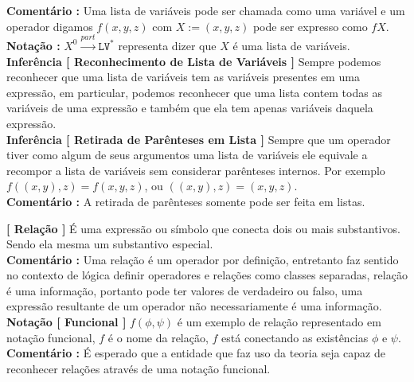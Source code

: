 \documentclass[10pt,a4paper]{report}
\begin{document}
\textbf{Comentário :} Uma lista de variáveis pode ser chamada como uma variável e um operador digamos $f(x,y,z)$ com $X:=(x,y,z) $ pode ser expresso como $fX$.\\

\textbf{Notação :} $ X^0 \overset{part}{\rightarrow} \texttt{LV}^* $ representa dizer que $X$ é uma lista de variáveis.\\

\textbf{Inferência [ Reconhecimento de Lista de Variáveis ]} Sempre podemos reconhecer que uma lista de variáveis tem as variáveis presentes em uma expressão, em particular, podemos reconhecer que uma lista contem todas as variáveis de uma expressão e também que ela tem apenas variáveis daquela expressão.\\

\textbf{Inferência [ Retirada de Parênteses em Lista ]} Sempre que um operador tiver como algum de seus argumentos uma lista de variáveis ele equivale a recompor a lista de variáveis sem considerar parênteses internos. Por exemplo $ f((x,y),z) = f(x,y,z) $, ou $ ((x,y),z) = (x,y,z) $.\\

\textbf{Comentário :} A retirada de parênteses somente pode ser feita em listas.

\hspace{\baselineskip}

\textbf{[ Relação ]} É uma expressão ou símbolo que conecta dois ou mais substantivos. Sendo ela mesma um substantivo especial.  \\

\textbf{Comentário :} Uma relação é um operador por definição, entretanto faz sentido no contexto de lógica definir operadores e relações como classes separadas, relação é uma informação, portanto pode ter valores de verdadeiro ou falso, uma expressão resultante de um operador não necessariamente é uma informação.\\

\textbf{Notação [ Funcional ]} $f(\phi,\psi)$ é um exemplo de relação representado em notação funcional, $f$ é o nome da relação, $f$ está conectando as existências $\phi$ e $\psi$.\\

\textbf{Comentário :} É esperado que a entidade que faz uso da teoria seja capaz de reconhecer relações através de uma notação funcional.\\
\end{document}
